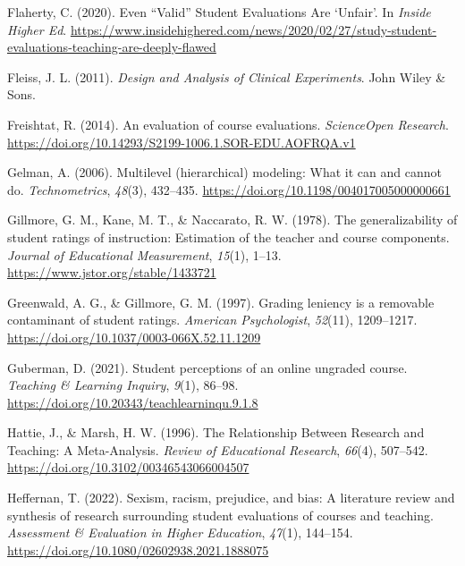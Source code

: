 \documentclass[
  man]{apa7}
\newlength{\cslhangindent}
\newlength{\cslentryspacingunit} %
\newenvironment{CSLReferences}[2] %
 {%
  \setlength{\parindent}{0pt}
  \ifodd #1
  \let\oldpar\par
  \def\par{\hangindent=\cslhangindent\oldpar}
  \fi
  \setlength{\parskip}{#2\cslentryspacingunit}
 }%
 {}
\begin{document}
\begin{CSLReferences}{1}{0}
\leavevmode{}%
Flaherty, C. (2020). Even {``{Valid}''} {Student} {Evaluations} {Are} `{Unfair}'. In \emph{Inside Higher Ed}. \url{https://www.insidehighered.com/news/2020/02/27/study-student-evaluations-teaching-are-deeply-flawed}

\leavevmode{}%
Fleiss, J. L. (2011). \emph{Design and Analysis of Clinical Experiments}. John Wiley \& Sons.

\leavevmode{}%
Freishtat, R. (2014). An evaluation of course evaluations. \emph{ScienceOpen Research}. \url{https://doi.org/10.14293/S2199-1006.1.SOR-EDU.AOFRQA.v1}

\leavevmode{}%
Gelman, A. (2006). Multilevel (hierarchical) modeling: What it can and cannot do. \emph{Technometrics}, \emph{48}(3), 432--435. \url{https://doi.org/10.1198/004017005000000661}

\leavevmode{}%
Gillmore, G. M., Kane, M. T., \& Naccarato, R. W. (1978). The generalizability of student ratings of instruction: Estimation of the teacher and course components. \emph{Journal of Educational Measurement}, \emph{15}(1), 1--13. \url{https://www.jstor.org/stable/1433721}

\leavevmode{}%
Greenwald, A. G., \& Gillmore, G. M. (1997). Grading leniency is a removable contaminant of student ratings. \emph{American Psychologist}, \emph{52}(11), 1209--1217. \url{https://doi.org/10.1037/0003-066X.52.11.1209}

\leavevmode{}%
Guberman, D. (2021). Student perceptions of an online ungraded course. \emph{Teaching \& Learning Inquiry}, \emph{9}(1), 86--98. \url{https://doi.org/10.20343/teachlearninqu.9.1.8}

\leavevmode{}%
Hattie, J., \& Marsh, H. W. (1996). The Relationship Between Research and Teaching: A Meta-Analysis. \emph{Review of Educational Research}, \emph{66}(4), 507--542. \url{https://doi.org/10.3102/00346543066004507}

\leavevmode{}%
Heffernan, T. (2022). Sexism, racism, prejudice, and bias: A literature review and synthesis of research surrounding student evaluations of courses and teaching. \emph{Assessment \& Evaluation in Higher Education}, \emph{47}(1), 144--154. \url{https://doi.org/10.1080/02602938.2021.1888075}


\end{CSLReferences}
\end{document}
